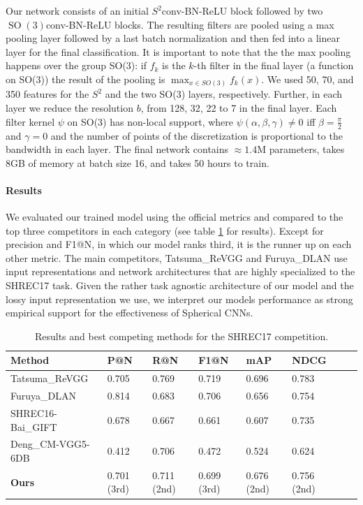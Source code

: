 \documentclass{article} %
\newcommand{\SO}[1]{\ensuremath{\operatorname{SO}(#1)}}
\begin{document}
Our network consists of an initial $S^2$conv-BN-ReLU block followed by two $\SO3$conv-BN-ReLU blocks.
The resulting filters are pooled using a max pooling layer followed by a last batch normalization and then fed into a linear layer for the final classification.
It is important to note that the the max pooling happens over the group SO(3): if $f_k$ is the $k$-th filter in the final layer (a function on SO(3)) the result of the pooling is $\max_{x\in SO(3)} f_k(x)$.
We used 50, 70, and 350 features for the $S^2$ and the two SO(3) layers, respectively.
Further, in each layer we reduce the resolution $b$, from 128, 32, 22 to 7 in the final layer.
Each filter kernel $\psi$ on SO(3) has non-local support, where $\psi(\alpha, \beta, \gamma) \neq 0$ iff $\beta = \frac{\pi}{2}$ and $\gamma = 0$ and the number of points of the discretization is proportional to the bandwidth in each layer.
The final network contains $\approx1.4$M parameters, takes 8GB of memory at batch size 16, and takes 50 hours to train.


\paragraph{Results}
We evaluated our trained model using the official metrics and compared to the top three competitors in each category (see table \ref{tab:shapenet_results} for results). Except for precision and F1@N, in which our model ranks third, it is the runner up on each other metric.
The main competitors, Tatsuma\_ReVGG and Furuya\_DLAN use input representations and network architectures that are highly specialized to the SHREC17 task.
Given the rather task agnostic architecture of our model and the lossy input representation we use, we interpret our models performance as strong empirical support for the effectiveness of Spherical CNNs.

\begin{table}
    \centering
    \begin{tabular}{llllllll}
   Method           & P@N & R@N   & F1@N  & mAP   & NDCG  \\ \hline
   Tatsuma\_ReVGG   & 0.705  & 0.769 & 0.719 & 0.696 & 0.783 \\ %
   Furuya\_DLAN     & 0.814 & 0.683 & 0.706 & 0.656 & 0.754 \\ %
   SHREC16-Bai\_GIFT &0.678& 0.667 & 0.661 & 0.607 & 0.735 \\ %
   Deng\_CM-VGG5-6DB &0.412& 0.706 & 0.472 & 0.524 & 0.624 \\
   \hline
   \textbf{Ours}   & 0.701 (3rd) & 0.711 (2nd) & 0.699 (3rd) & 0.676 (2nd) & 0.756 (2nd)
    \end{tabular}
    \caption{\label{tab:shapenet_results} Results and best competing methods for the SHREC17 competition.}
\end{table}
\end{document}
